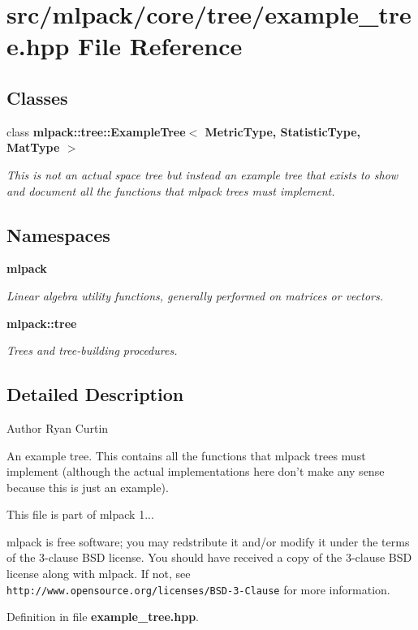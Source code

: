\section{src/mlpack/core/tree/example\-\_\-tree.hpp File Reference}
\label{example__tree_8hpp}
\subsection*{Classes}
\begin{DoxyCompactItemize}
\item 
class {\bf mlpack\-::tree\-::\-Example\-Tree$<$ Metric\-Type, Statistic\-Type, Mat\-Type $>$}
\begin{DoxyCompactList}\small\item\em This is not an actual space tree but instead an example tree that exists to show and document all the functions that mlpack trees must implement. \end{DoxyCompactList}\end{DoxyCompactItemize}
\subsection*{Namespaces}
\begin{DoxyCompactItemize}
\item 
{\bf mlpack}
\begin{DoxyCompactList}\small\item\em Linear algebra utility functions, generally performed on matrices or vectors. \end{DoxyCompactList}\item 
{\bf mlpack\-::tree}
\begin{DoxyCompactList}\small\item\em Trees and tree-\/building procedures. \end{DoxyCompactList}\end{DoxyCompactItemize}


\subsection{Detailed Description}
\begin{DoxyAuthor}{Author}
Ryan Curtin
\end{DoxyAuthor}
An example tree. This contains all the functions that mlpack trees must implement (although the actual implementations here don't make any sense because this is just an example).

This file is part of mlpack 1...

mlpack is free software; you may redstribute it and/or modify it under the terms of the 3-\/clause B\-S\-D license. You should have received a copy of the 3-\/clause B\-S\-D license along with mlpack. If not, see {\tt http\-://www.\-opensource.\-org/licenses/\-B\-S\-D-\/3-\/\-Clause} for more information. 

Definition in file {\bf example\-\_\-tree.\-hpp}.

